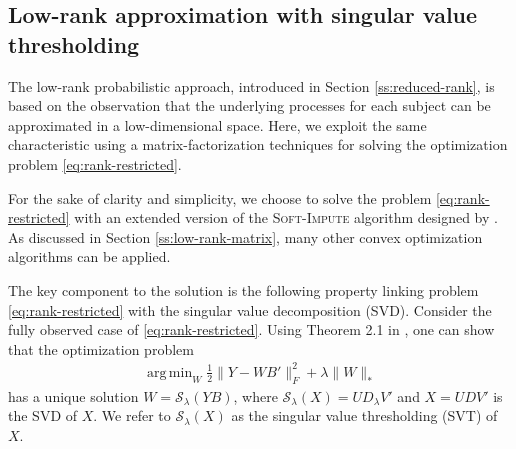 \documentclass[preprint]{imsart}
\numberwithin{equation}{section}
\theoremstyle{plain}
\newcommand{\cS}{\mathcal{S}}
\DeclareMathOperator*{\argmin}{arg\,min}
\begin{document}
\subsection{Low-rank approximation with singular value thresholding}\label{ss:matrix-factorization}

The low-rank probabilistic approach, introduced in Section \ref{ss:reduced-rank}, is based on the observation that the underlying processes for each subject can be approximated in a low-dimensional space. %
Here, we exploit the same characteristic using a matrix-factorization techniques for solving the optimization problem \eqref{eq:rank-restricted}.


For the sake of clarity and simplicity, we choose to solve the problem \eqref{eq:rank-restricted} with an extended version of the \textsc{Soft-Impute} algorithm designed by \citet{hastie2015matrix,mazumder2010spectral}. As discussed in Section \ref{ss:low-rank-matrix}, many other convex optimization algorithms can be applied.

The key component to the solution is the following property linking problem \eqref{eq:rank-restricted} with the singular value decomposition (SVD). Consider the fully observed case of \eqref{eq:rank-restricted}. Using Theorem 2.1 in \citet{cai2010singular}, one can show that the optimization problem
\begin{align}\label{eq:optsvd}
\argmin_{W} \frac{1}{2} \| Y - WB' \|_F^2 + \lambda\|W\|_*
\end{align}
has a unique solution $W = \cS_\lambda (YB)$, where $\cS_\lambda(X) = UD_\lambda V'$ and $X = UDV'$ is the SVD of $X$. We refer to $\cS_\lambda(X)$ as the singular value thresholding (SVT) of $X$.
\end{document}
